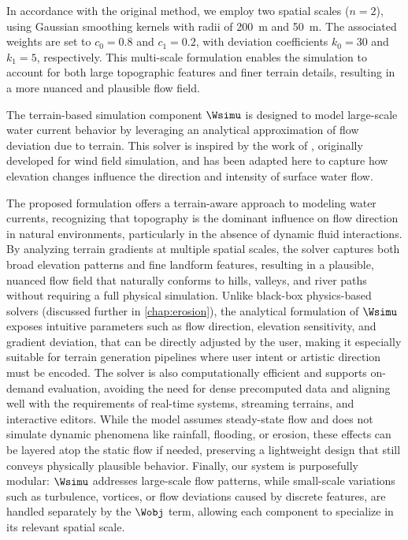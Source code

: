 In accordance with the original method, we employ two spatial scales ($n = 2$), using Gaussian smoothing kernels with radii of 200~m and 50~m. The associated weights are set to $c_0 = 0.8$ and $c_1 = 0.2$, with deviation coefficients $k_0 = 30$ and $k_1 = 5$, respectively. This multi-scale formulation enables the simulation to account for both large topographic features and finer terrain details, resulting in a more nuanced and plausible flow field.

The terrain-based simulation component $\Wsimu$ is designed to model large-scale water current behavior by leveraging an analytical approximation of flow deviation due to terrain. This solver is inspired by the work of \cite{Paris2019b}, originally developed for wind field simulation, and has been adapted here to capture how elevation changes influence the direction and intensity of surface water flow.


The proposed formulation offers a terrain-aware approach to modeling water currents, recognizing that topography is the dominant influence on flow direction in natural environments, particularly in the absence of dynamic fluid interactions. By analyzing terrain gradients at multiple spatial scales, the solver captures both broad elevation patterns and fine landform features, resulting in a plausible, nuanced flow field that naturally conforms to hills, valleys, and river paths without requiring a full physical simulation. Unlike black-box physics-based solvers (discussed further in \cref{chap:erosion}), the analytical formulation of $\Wsimu$ exposes intuitive parameters such as flow direction, elevation sensitivity, and gradient deviation, that can be directly adjusted by the user, making it especially suitable for terrain generation pipelines where user intent or artistic direction must be encoded. The solver is also computationally efficient and supports on-demand evaluation, avoiding the need for dense precomputed data and aligning well with the requirements of real-time systems, streaming terrains, and interactive editors. While the model assumes steady-state flow and does not simulate dynamic phenomena like rainfall, flooding, or erosion, these effects can be layered atop the static flow if needed, preserving a lightweight design that still conveys physically plausible behavior. Finally, our system is purposefully modular: $\Wsimu$ addresses large-scale flow patterns, while small-scale variations such as turbulence, vortices, or flow deviations caused by discrete features, are handled separately by the $\Wobj$ term, allowing each component to specialize in its relevant spatial scale.


